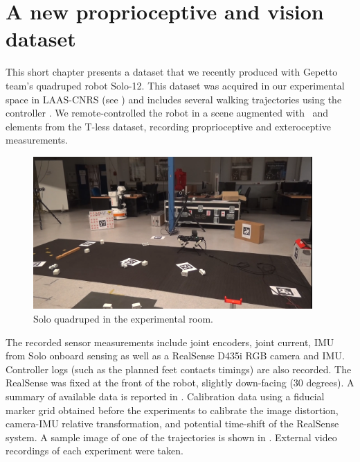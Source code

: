 \chapter{A new proprioceptive and vision dataset}

This short chapter presents a dataset that we recently produced with Gepetto team's quadruped robot Solo-12. This dataset was acquired in our experimental space 
in LAAS-CNRS (see ) and includes several walking trajectories using the controller \cite{leziart2021implementation}. We remote-controlled the robot in a scene augmented 
with \apriltags\ and elements from the T-less dataset, recording proprioceptive and exteroceptive measurements. 

\begin{figure}[h]
    \centering
    \includegraphics[width=0.95\textwidth]{figures/solo_dataset_scene.png}
    \caption{Solo quadruped in the experimental room.}
    \label{fig:solo_dataset_scene}
\end{figure}

The recorded sensor measurements include joint encoders, joint current, IMU from Solo onboard sensing as well as a RealSense D435i RGB camera and IMU.
Controller logs (such as the planned feet contacts timings) are also recorded. The RealSense was fixed at the front of the robot, slightly down-facing (30 degrees).
A summary of available data is reported in . Calibration data using a fiducial marker grid obtained before the experiments to 
calibrate the image distortion, camera-IMU relative transformation, and potential time-shift of the RealSense system. A sample image of one of the trajectories
is shown in .
External video recordings of each experiment were taken.

